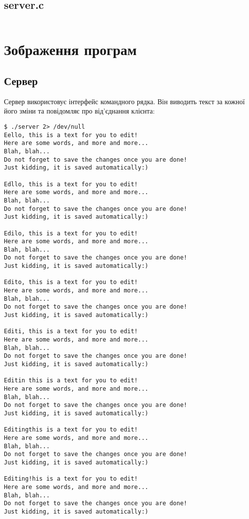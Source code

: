 \documentclass[a4paper]{article}
\begin{document}
\subsection{server.c}
\inputminted{C}{server.c}

\section{Зображення програм}

\subsection{Сервер}
Сервер використовує інтерфейс командного рядка. Він виводить текст за кожної
його зміни та повідомляє про від'єднання клієнта:

\begin{verbatim}
$ ./server 2> /dev/null
Eello, this is a text for you to edit!
Here are some words, and more and more...
Blah, blah...
Do not forget to save the changes once you are done!
Just kidding, it is saved automatically:)

Edllo, this is a text for you to edit!
Here are some words, and more and more...
Blah, blah...
Do not forget to save the changes once you are done!
Just kidding, it is saved automatically:)

Edilo, this is a text for you to edit!
Here are some words, and more and more...
Blah, blah...
Do not forget to save the changes once you are done!
Just kidding, it is saved automatically:)

Edito, this is a text for you to edit!
Here are some words, and more and more...
Blah, blah...
Do not forget to save the changes once you are done!
Just kidding, it is saved automatically:)

Editi, this is a text for you to edit!
Here are some words, and more and more...
Blah, blah...
Do not forget to save the changes once you are done!
Just kidding, it is saved automatically:)

Editin this is a text for you to edit!
Here are some words, and more and more...
Blah, blah...
Do not forget to save the changes once you are done!
Just kidding, it is saved automatically:)

Editingthis is a text for you to edit!
Here are some words, and more and more...
Blah, blah...
Do not forget to save the changes once you are done!
Just kidding, it is saved automatically:)

Editing!his is a text for you to edit!
Here are some words, and more and more...
Blah, blah...
Do not forget to save the changes once you are done!
Just kidding, it is saved automatically:)


\end{verbatim}
\end{document}
